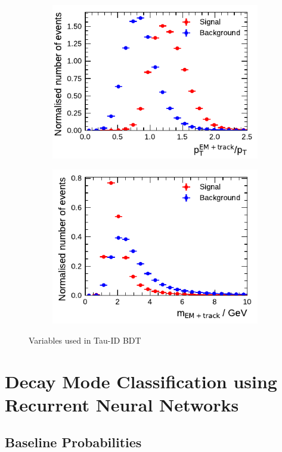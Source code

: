\begin{figure}[!ht]
\begin{subfigure}{0.5\textwidth}
  \end{subfigure}%
  \begin{subfigure}{0.5\textwidth}
    \centering
    \includegraphics{./figures/baseline_bdt_vars/3p/ptRatioEflowApprox.pdf}
  \end{subfigure}
  \begin{subfigure}{0.5\textwidth}
    \centering
    \includegraphics{./figures/baseline_bdt_vars/3p/mEflowApprox.pdf}
  \end{subfigure}
  \caption[]{Variables used in Tau-ID BDT}
\end{figure}

\clearpage
\section{Decay Mode Classification using Recurrent Neural Networks}
\subsection{Baseline Probabilities}

